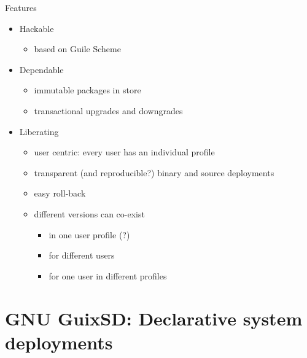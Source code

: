 \documentclass [t]{beamer}
\begin{document}
\begin {frame}{Features}
\begin {itemize}
\item
\textcolor {blau}{Hackable}
\begin {itemize}
\item
based on Guile Scheme
\end {itemize}
\item
\textcolor {blau}{Dependable}
\begin {itemize}
\item
immutable packages in store
\item
transactional upgrades \textcolor {gruen}{and downgrades}
\end {itemize}
\item
\textcolor {blau}{Liberating}
\begin {itemize}
\item
user centric: every user has an individual profile
\item
transparent (and reproducible?) binary and source deployments
\item
easy roll-back
\item
different versions can co-exist
\begin {itemize}
\item
in \textcolor {gruen}{one user profile} (?)
\item
for \textcolor {gruen}{different users}
\item
for one user in \textcolor {gruen}{different profiles}
\end {itemize}
\end {itemize}
\end {itemize}
\end {frame}



\section {GNU GuixSD: Declarative system deployments}
\end{document}
